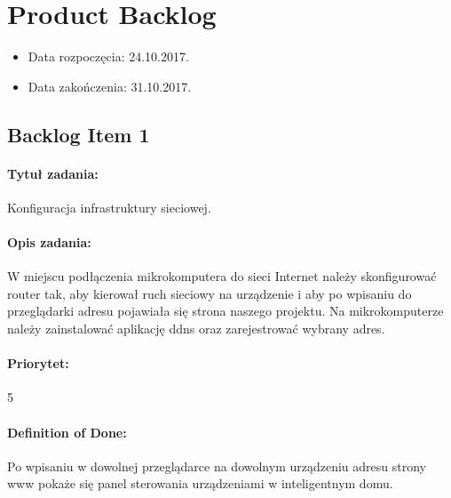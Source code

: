 	


\section{Product Backlog}
	\begin{itemize}
		\item Data rozpoczęcia: 24.10.2017.
		\item  Data zakończenia: 31.10.2017.
	\end{itemize}

	\subsection{Backlog Item 1}
	\paragraph{Tytuł zadania:}
	Konfiguracja infrastruktury sieciowej.
	
	\paragraph{Opis zadania:}
	W miejscu podłączenia mikrokomputera do sieci Internet należy skonfigurować router tak, aby kierował ruch sieciowy na urządzenie i aby po wpisaniu do przeglądarki adresu pojawiała się strona naszego projektu. Na mikrokomputerze należy zainstalować aplikację ddns oraz zarejestrować wybrany adres.
	
	\paragraph{Priorytet:}
	5
	
	\paragraph{Definition of Done:}
	Po wpisaniu w dowolnej przeglądarce na dowolnym urządzeniu adresu strony www pokaże się panel sterowania urządzeniami w inteligentnym domu.
	

